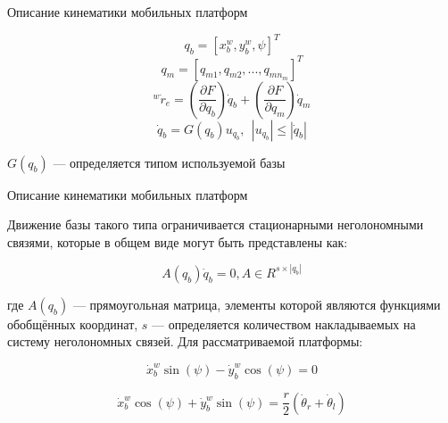 \documentclass[newPxFont,numfooter,sectionpages]{beamer}
\begin{document}
\begin{frame}{Описание кинематики мобильных платформ}
\begin{minipage}{0.56\textwidth}
\begin{equation}
				\tag{1} \label{eq:1}
			\end{equation}
			\begin{equation}
			q_b = [x^w_b, y^w_b, \psi]^T
			\tag{2} \label{eq:2}
			\end{equation}
			\begin{equation}
			q_m = [q_{m1}, q_{m2}, ..., q_{mn_m}]^T
			\tag{3} \label{eq:3}
			\end{equation}
			\begin{equation}
			{^w\dot{r}_e} = \left(\frac{\partial F}{\partial q_b}\right)\dot{q}_b + \left(\frac{\partial F}{\partial q_m}\right)\dot{q}_m
			\tag{4} \label{eq:4}
			\end{equation}
			\begin{equation}
			\dot{q}_b = G(q_b)u_{q_b}, \ \ |u_{q_b}| \leqslant |\dot{q}_b|
			\tag{5} \label{eq:5}
			\end{equation}
	\end{minipage}
	\begin{center}
	\begin{minipage}{0.8\textwidth}
	\begin{center}
	
	$G(q_b)$ --- определяется типом используемой базы
	\end{center}
	\end{minipage}
	\end{center}
	
\end{frame}

\begin{frame}{Описание кинематики мобильных платформ}

	\begin{center}
		\begin{minipage}[b]{0.9\textwidth}
			Движение базы такого типа ограничивается стационарными неголономными связями, которые в общем виде могут быть представлены как:
	
			\begin{equation}
				A(q_b)\dot{q}_b = 0, A \in R^{s\times|q_b|}
				\tag{6} \label{eq:6}
			\end{equation}

			\noindent
			где $A(q_b)$ --- прямоугольная матрица, элементы которой являются функциями обобщённых координат, $s$ --- определяется количеством накладываемых на систему неголономных связей. Для рассматриваемой платформы:
			
			\begin{equation}
				\dot{x}^w_b\sin(\psi) - \dot{y}^w_b\cos(\psi) = 0
				\tag{7} \label{eq:7}
			\end{equation}
			
			\begin{equation}
				\dot{x}^w_b\cos(\psi) + \dot{y}^w_b\sin(\psi) = \frac{r}{2}(\dot{\theta}_r + \dot{\theta}_l)
				\tag{8} \label{eq:8}
			\end{equation}	
		\end{minipage}
	\end{center}
\end{frame}
\end{document}
